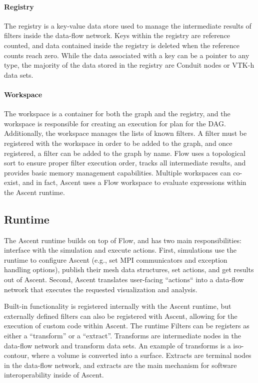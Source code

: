 \paragraph{Registry}
The registry is a key-value data store used to manage the intermediate
results of filters inside the data-flow network.
%
Keys within the registry are reference counted, and data contained
inside the registry is deleted when the reference counts reach zero.
%
While the data associated with a key can be a pointer to any type,
the majority of the data stored in the registry are Conduit nodes
or VTK-h data sets.


\paragraph{Workspace}
The workspace is a container for both the graph and the registry,
and the workspace is responsible for creating an execution for plan
for the DAG.
%
Additionally, the workspace manages the lists of known filters.
%
A filter must be registered with the workspace in order to be added to the
graph, and once registered, a filter can be added to the graph by name.
%
Flow uses a topological sort to ensure proper filter execution order,
tracks all intermediate results, and provides basic memory management capabilities.
%
Multiple workspaces can co-exist, and in fact, Ascent uses a Flow workspace
to evaluate expressions within the Ascent runtime.
%

\subsection{Runtime}
The Ascent runtime builds on top of Flow, and has two main responsibilities:
interface with the simulation and execute actions.
%
First, simulations use the runtime to configure Ascent (e.g., set MPI communicators and
exception handling options), publish their mesh data structures, set actions,
and get results out of Ascent.
%
Second, Ascent translates user-facing ``actions`` into a data-flow network that executes the requested visualization and analysis.
%


Built-in functionality is registered internally with the Ascent runtime,
but externally defined filters can also be registered with Ascent,
allowing for the execution of custom code within Ascent.
%
The runtime Filters can be registers as either a ``transform'' or a ``extract''.
%
Transforms are intermediate nodes in the data-flow network and transform
data sets.
%
An example of transforms is a iso-contour, where a volume is converted
into a surface.
%
Extracts are terminal nodes in the data-flow network, and extracts
are the main mechanism for software interoperability inside of Ascent.

